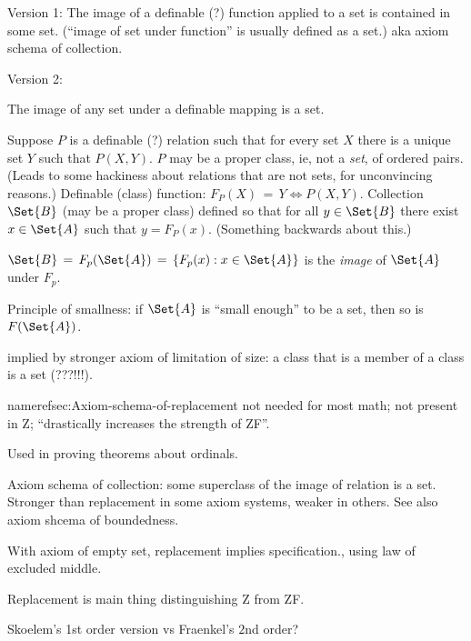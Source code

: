 \label{sec:Axiom-schema-of-replacement}

Version 1: 
The image of a definable (?) function applied to a set
is contained in some set.\cite{wiki:Axiom_schema_of_replacement}
(``image of set under function'' is usually defined as a set.)
aka axiom schema of collection.

Version 2: 

The image of any set under a definable mapping is a set.

Suppose $P$ is a definable (?) relation such that for every
set $X$ there is a unique set $Y$ such that $P(X,Y)$.
$P$ may be a proper class\cite{wiki:Class_set_theory}, 
ie, not a \textit{set}, of ordered pairs. 
(Leads to some hackiness about relations that are not sets,
for unconvincing reasons\cite{wiki:Binary_relation}.)
Definable (class) function: $F_P(X)\,=\,Y \iff P(X,Y)$.
Collection $\Set{B}$ (may be a proper class)
defined so that for all $y\in\Set{B}$ there exist $x \in \Set{A}$
such that $y=F_P(x)$.
(Something backwards about this.)

$\Set{B}\,=\,F_p(\Set{A}) \,=\, \{F_p(x) : x \in \Set{A}\}$ 
is the \textsl{image} of $\Set{A}$ under $F_p$.

Principle of smallness: if $\Set{A}$ is 
``small enough'' to be a set,
then so is $F(\Set{A})$.

 implied by stronger
axiom of limitation of 
size\cite{wiki:Axiom_of_limitation_of_size}:
a class that is a member of a class is a set (???!!!).

nameref{sec:Axiom-schema-of-replacement} not needed for most math;
not present in \textsf{Z};
``drastically increases the strength of \textsf{ZF}''.

Used in proving theorems about ordinals.

Axiom schema of collection: some superclass of 
the image of relation is a set.
Stronger than replacement
in some axiom systems, weaker in others.
See also axiom shcema of boundedness.

With axiom of empty set, replacement implies specification.,
using law of excluded middle.

Replacement is main thing distinguishing \textsf{Z}
from \textsf{ZF}.

Skoelem's 1st order version vs Fraenkel's $2$nd order?
\label{sec:Axiom-of-infinity}

